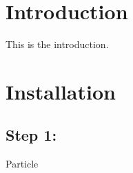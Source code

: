 \hypertarget{index_intro_sec}{}\section{Introduction}\label{index_intro_sec}
This is the introduction.\hypertarget{index_install_sec}{}\section{Installation}\label{index_install_sec}
\hypertarget{index_step1}{}\subsection{Step 1\+:}\label{index_step1}
Particle 